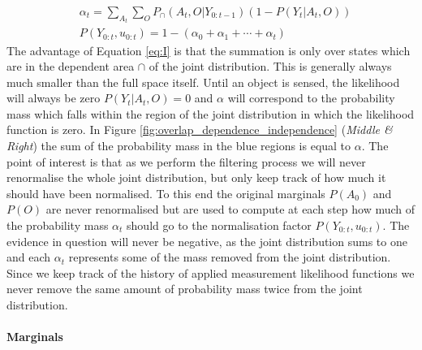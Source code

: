 \begin{align}\label{eq:I}
 &\alpha_t 	  = \sum\limits_{A_t}\sum\limits_{O} P_{\cap}(A_t,O|Y_{0:t-1}) (1 - P(Y_t|A_t,O)) \\
 &P(Y_{0:t},u_{0:t})      = 1 - (\alpha_{0} + \alpha_{1} + \cdots + \alpha_{t})
\end{align}
The advantage of Equation \ref{eq:I} is that the summation is only over states which are in the dependent area $\cap$ of the joint 
distribution. This is generally always much smaller than the full space itself.
Until an object is sensed, the likelihood will always be zero $P(Y_t|A_t,O) = 0$ and $\alpha$ will correspond to the probability 
mass which falls within the region of the joint distribution in which the likelihood function is zero. In Figure 
\ref{fig:overlap_dependence_independence} (\textit{Middle \& Right}) the sum of the probability mass in the blue 
regions is equal to $\alpha$.
The point of interest is that as we perform the filtering process we will never renormalise the whole joint distribution, but only keep 
track of how much it should have been normalised. To this end the original marginals $P(A_0)$ and $P(O)$  are never renormalised but are used 
to compute at each step how much of the probability mass $\alpha_t$ should go to the normalisation factor $P(Y_{0:t},u_{0:t})$. 
The evidence in question will never be negative, as the joint distribution sums to one and each $\alpha_t$ represents some of the mass removed from the joint distribution. Since we 
keep track of the history of applied  measurement likelihood functions we never remove the same amount of probability mass twice
from the joint distribution.

\paragraph{Marginals}

